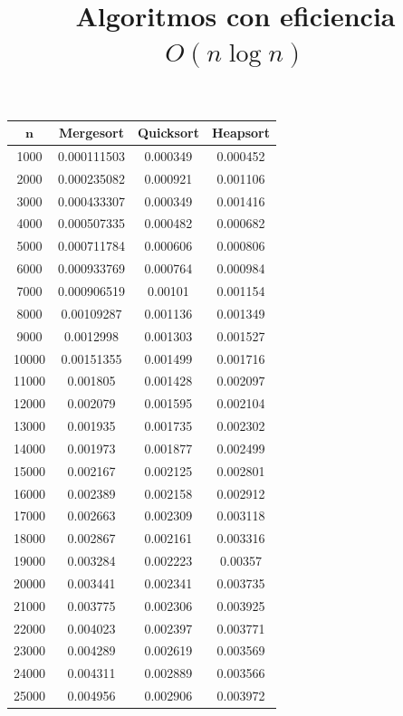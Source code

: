 \documentclass[a4]{article}
\begin{document}
\begin{table}[H]
\hfill

\begin{minipage}{0.45\linewidth}
\centering
\title{\large Algoritmos con eficiencia $O(n\log n)$\vspace{4mm}}
\begin{tabular}{| c c c c |}
\hline
$\textbf{n}$ & \textbf{Mergesort} & \textbf{Quicksort} & \textbf{Heapsort} \\ \hline
  1000  & 0.000111503 & 0.000349 & 0.000452 \\ 
  2000  & 0.000235082 & 0.000921 & 0.001106 \\ 
  3000  & 0.000433307 & 0.000349 & 0.001416 \\ 
  4000  & 0.000507335 & 0.000482 & 0.000682 \\ 
  5000  & 0.000711784 & 0.000606 & 0.000806 \\ 
  6000  & 0.000933769 & 0.000764 & 0.000984 \\ 
  7000  & 0.000906519 & 0.00101  & 0.001154 \\ 
  8000  & 0.00109287  & 0.001136 & 0.001349 \\ 
  9000  & 0.0012998   & 0.001303 & 0.001527 \\ 
  10000 & 0.00151355  & 0.001499 & 0.001716 \\ 
  11000 & 0.001805    & 0.001428 & 0.002097 \\ 
  12000 & 0.002079    & 0.001595 & 0.002104 \\ 
  13000 & 0.001935    & 0.001735 & 0.002302 \\
  14000 & 0.001973    & 0.001877 & 0.002499 \\
  15000 & 0.002167    & 0.002125 & 0.002801 \\
  16000 & 0.002389    & 0.002158 & 0.002912 \\
  17000 & 0.002663    & 0.002309 & 0.003118 \\
  18000 & 0.002867    & 0.002161 & 0.003316 \\
  19000 & 0.003284    & 0.002223 & 0.00357  \\
  20000 & 0.003441    & 0.002341 & 0.003735 \\
  21000 & 0.003775    & 0.002306 & 0.003925 \\
  22000 & 0.004023    & 0.002397 & 0.003771 \\
  23000 & 0.004289    & 0.002619 & 0.003569 \\
  24000 & 0.004311    & 0.002889 & 0.003566 \\
  25000 & 0.004956    & 0.002906 & 0.003972 \\ \hline
\end{tabular}
\end{minipage}
\end{table}
\end{document}
